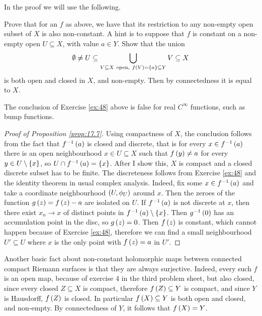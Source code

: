 \pagebreak

In the proof we will use the following.

\begin{exercise}
\label{ex:48}
Prove that for an $ f $ as above, we have that its restriction to any non-empty open subset of $ X $ is also non-constant. A hint is to suppose that $ f $ is constant on a non-empty open $ U \subseteq X $, with value $ a \in Y $. Show that the union
$$ \emptyset \ne U \subseteq \bigcup_{V \subseteq X \ \text{open}, \ f\br{V} = \cbr{a} \subseteq Y} V \subseteq X $$
is both open and closed in $ X $, and non-empty. Then by connectedness it is equal to $ X $.
\end{exercise}

\begin{remark}
The conclusion of Exercise \ref{ex:48} above is false for real $ C^\infty $ functions, such as bump functions.
\end{remark}

\begin{proof}[Proof of Proposition \ref{prop:17.7}]
Using compactness of $ X $, the conclusion follows from the fact that $ f^{-1}\br{a} $ is closed and discrete, that is for every $ x \in f^{-1}\br{a} $ there is an open neighbourhood $ x \in U \subseteq X $ such that $ f\br{y} \ne a $ for every $ y \in U \setminus \cbr{x} $, so $ U \cap f^{-1}\br{a} = \cbr{x} $. After I show this, $ X $ is compact and a closed discrete subset has to be finite. The discreteness follows from Exercise \ref{ex:48} and the identity theorem in usual complex analysis. Indeed, fix some $ x \in f^{-1}\br{a} $ and take a coordinate neighbourhood $ \br{U, \phi_U} $ around $ x $. Then the zeroes of the function $ g\br{z} = f\br{z} - a $ are isolated on $ U $. If $ f^{-1}\br{a} $ is not discrete at $ x $, then there exist $ x_n \to x $ of distinct points in $ f^{-1}\br{a} \setminus \cbr{x} $. Then $ g^{-1}\br{0} $ has an accumulation point in the disc, so $ g\br{z} = 0 $. Then $ f\br{z} $ is constant, which cannot happen because of Exercise \ref{ex:48}, therefore we can find a small neighbourhood $ U' \subseteq U $ where $ x $ is the only point with $ f\br{z} = a $ in $ U' $.
\end{proof}

\begin{remark}
Another basic fact about non-constant holomorphic maps between connected compact Riemann surfaces is that they are always surjective. Indeed, every such $ f $ is an open map, because of exercise $ 4 $ in the third problem sheet, but also closed, since every closed $ Z \subseteq X $ is compact, therefore $ f\br{Z} \subseteq Y $ is compact, and since $ Y $ is Hausdorff, $ f\br{Z} $ is closed. In particular $ f\br{X} \subseteq Y $ is both open and closed, and non-empty. By connectedness of $ Y $, it follows that $ f\br{X} = Y $.
\end{remark}

